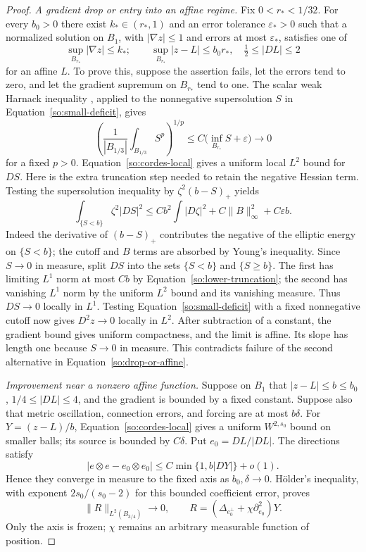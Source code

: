 \begin{proof}
\emph{A gradient drop or entry into an affine regime.}
Fix $0<r_*<1/32$.  For every $b_0>0$ there exist $k_*\in(r_*,1)$ and
an error tolerance $\varepsilon_*>0$ such that a normalized solution on
$B_1$, with $|\nabla z|\le1$ and errors at most $\varepsilon_*$, satisfies
one of
\begin{equation}\label{so:drop-or-affine}
 \sup_{B_{r_*}}|\nabla z|\le k_*;
 \qquad
 \sup_{B_{r_*}}|z-L|\le b_0r_*,\quad \tfrac12\le|DL|\le2
\end{equation}
for an affine $L$.  To prove this, suppose the assertion fails, let the
errors tend to zero, and let the gradient supremum on $B_{r_*}$ tend to
one.  The scalar weak Harnack inequality
\cite[Theorem 8.18]{GilbargTrudinger2001}, applied to the nonnegative
supersolution $S$ in Equation~\ref{so:small-deficit}, gives
\[
 \left(\frac{1}{|B_{1/3}|}\int_{B_{1/3}} S^p\right)^{1/p}
 \le C\bigl(\inf_{B_{r_*}}S+\varepsilon\bigr)\longrightarrow0
\]
for a fixed $p>0$.  Equation~\ref{so:cordes-local} gives a uniform local
$L^2$ bound for $DS$.
Here is the extra truncation step needed to retain the negative Hessian
term.  Testing the supersolution inequality by
$\zeta^2(b-S)_+$ yields
\begin{equation}\label{so:lower-truncation}
 \int_{\{S<b\}}\zeta^2|DS|^2
 \le Cb^2\int|D\zeta|^2+C\|B\|_\infty^2
       +C\varepsilon b.
\end{equation}
Indeed the derivative of $(b-S)_+$ contributes the negative of the
elliptic energy on $\{S<b\}$; the cutoff and $B$ terms are absorbed by
Young's inequality.  Since $S\to0$ in measure, split $DS$ into the sets
$\{S<b\}$ and $\{S\ge b\}$.  The first has limiting $L^1$ norm at most
$Cb$ by Equation~\ref{so:lower-truncation}; the second has vanishing
$L^1$ norm by the uniform $L^2$ bound and its vanishing measure.  Thus
$DS\to0$ locally in $L^1$.  Testing Equation~\ref{so:small-deficit} with
a fixed nonnegative cutoff now gives $D^2z\to0$ locally in $L^2$.
After subtraction of a constant, the gradient bound gives uniform
compactness, and the limit is affine.  Its slope has length one because
$S\to0$ in measure.  This contradicts failure of the second alternative
in Equation~\ref{so:drop-or-affine}.

\emph{Improvement near a nonzero affine function.}
Suppose on $B_1$ that $|z-L|\le b\le b_0$, $1/4\le|DL|\le4$, and the
gradient is bounded by a fixed constant.  Suppose also that metric
oscillation, connection errors, and forcing are at most $b\delta$.
For $Y=(z-L)/b$, Equation~\ref{so:cordes-local} gives a uniform
$W^{2,s_0}$ bound on smaller balls; its source is bounded by $C\delta$.
Put $e_0=DL/|DL|$.  The directions satisfy
\[
 |e\otimes e-e_0\otimes e_0|
       \le C\min\{1,b|DY|\}+o(1).
\]
Hence they converge in measure to the fixed axis as $b_0,\delta\to0$.
H\"older's inequality, with exponent
$2s_0/(s_0-2)$ for this bounded coefficient error, proves
\begin{equation}\label{so:frozen-residual}
 \|R\|_{L^2(B_{3/4})}\longrightarrow0,
 \qquad R=(\Delta_{e_0^\perp}+\chi\partial_{e_0}^2)Y.
\end{equation}
Only the axis is frozen; $\chi$ remains an arbitrary measurable function
of position.


\end{proof}
